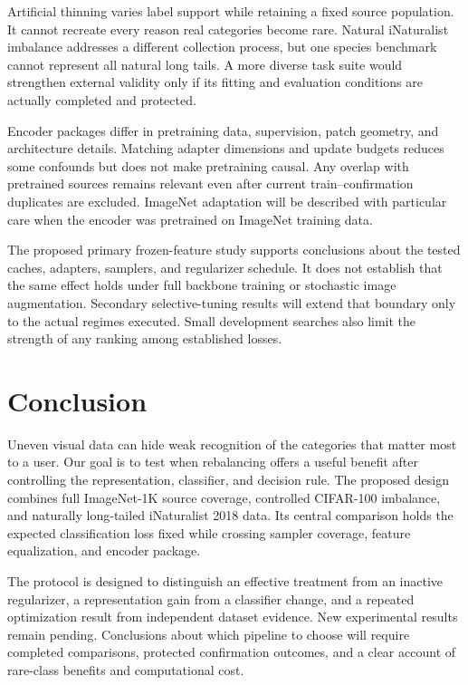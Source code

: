 \documentclass[conference]{IEEEtran}
\begin{document}
Artificial thinning varies label support while retaining a fixed source population. It cannot recreate every reason real categories become rare. Natural iNaturalist imbalance addresses a different collection process, but one species benchmark cannot represent all natural long tails. A more diverse task suite would strengthen external validity only if its fitting and evaluation conditions are actually completed and protected.

Encoder packages differ in pretraining data, supervision, patch geometry, and architecture details. Matching adapter dimensions and update budgets reduces some confounds but does not make pretraining causal. Any overlap with pretrained sources remains relevant even after current train--confirmation duplicates are excluded. ImageNet adaptation will be described with particular care when the encoder was pretrained on ImageNet training data.

The proposed primary frozen-feature study supports conclusions about the tested caches, adapters, samplers, and regularizer schedule. It does not establish that the same effect holds under full backbone training or stochastic image augmentation. Secondary selective-tuning results will extend that boundary only to the actual regimes executed. Small development searches also limit the strength of any ranking among established losses.

\section{Conclusion}
Uneven visual data can hide weak recognition of the categories that matter most to a user. Our goal is to test when rebalancing offers a useful benefit after controlling the representation, classifier, and decision rule. The proposed design combines full ImageNet-1K source coverage, controlled CIFAR-100 imbalance, and naturally long-tailed iNaturalist 2018 data. Its central comparison holds the expected classification loss fixed while crossing sampler coverage, feature equalization, and encoder package.

The protocol is designed to distinguish an effective treatment from an inactive regularizer, a representation gain from a classifier change, and a repeated optimization result from independent dataset evidence. New experimental results remain pending. Conclusions about which pipeline to choose will require completed comparisons, protected confirmation outcomes, and a clear account of rare-class benefits and computational cost.
\end{document}
